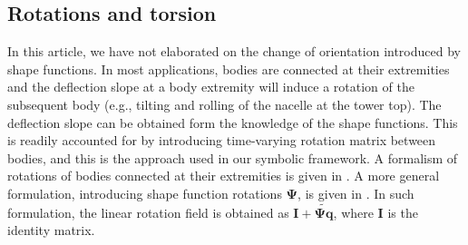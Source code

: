 \documentclass[wes, manuscript]{copernicus}
\renewcommand{\v}[1]{\boldsymbol{#1}}
\newcommand{\m}[1]{\boldsymbol{#1}}
\begin{document}
\subsection{Rotations and torsion}
In this article, we have not elaborated on the change of orientation introduced by shape functions.
In most applications, bodies are connected at their extremities and the deflection slope at a body extremity will induce a rotation of the subsequent body (e.g., tilting and rolling of the nacelle at the tower top).
The deflection slope can be obtained form the knowledge of the shape functions.
This is readily accounted for by introducing time-varying rotation matrix between bodies, and this is the approach used in our symbolic framework.
A formalism of rotations of bodies connected at their extremities is given in \cite{branlard:2019flex}.
A more general formulation, introducing shape function rotations $\m{\Psi}$, is given in \citep{Wallrapp:1994, Schwertassek:book, Lemmer:2018}.
In such formulation, the linear rotation field is obtained as $\m{I}+\m{\widetilde{\m{\Psi}\v{q}}}$, where $\m{I}$ is the identity matrix.
\end{document}
